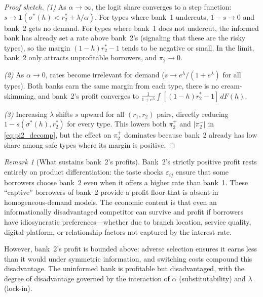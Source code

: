 \documentclass[12pt]{article}
\theoremstyle{plain}
\theoremstyle{plain}
\theoremstyle{definition}  %
\theoremstyle{remark}  %
\newtheorem{remark}[thm]{Remark}  %
\begin{document}
\begin{proof}[Proof sketch]
\emph{(1)} As $\alpha \to \infty$, the logit share converges to a step function: $s \to \mathbf{1}(\sigma^*(h) < r_2^* + \lambda/\alpha)$. For types where bank~1 undercuts, $1-s \to 0$ and bank~2 gets no demand. For types where bank~1 does not undercut, the informed bank has already set a rate above bank~2's (signaling that these are the risky types), so the margin $(1-h)r_2^* - 1$ tends to be negative or small. In the limit, bank~2 only attracts unprofitable borrowers, and $\pi_2 \to 0$.

\emph{(2)} As $\alpha \to 0$, rates become irrelevant for demand ($s \to e^{\lambda}/(1+e^{\lambda})$ for all types). Both banks earn the same margin from each type, there is no cream-skimming, and bank~2's profit converges to $\frac{1}{1+e^{\lambda}} \int [(1-h)r_2^* - 1]\, dF(h)$.

\emph{(3)} Increasing $\lambda$ shifts $s$ upward for all $(r_1, r_2)$ pairs, directly reducing $1-s(\sigma^*(h), r_2^*)$ for every type. This lowers both $\pi_2^+$ and $|\pi_2^-|$ in \eqref{eq:pi2_decomp}, but the effect on $\pi_2^+$ dominates because bank~2 already has low share among safe types where its margin is positive.
\end{proof}

\begin{remark}[What sustains bank~2's profits]
Bank~2's strictly positive profit rests entirely on product differentiation: the taste shocks $\varepsilon_{ij}$ ensure that some borrowers choose bank~2 even when it offers a higher rate than bank~1. These ``captive'' borrowers of bank~2 provide a profit floor that is absent in homogeneous-demand models. The economic content is that even an informationally disadvantaged competitor can survive and profit if borrowers have idiosyncratic preferences---whether due to branch location, service quality, digital platform, or relationship factors not captured by the interest rate.

However, bank~2's profit is bounded above: adverse selection ensures it earns less than it would under symmetric information, and switching costs compound this disadvantage. The uninformed bank is profitable but disadvantaged, with the degree of disadvantage governed by the interaction of $\alpha$ (substitutability) and $\lambda$ (lock-in).
\end{remark}


\end{document}
